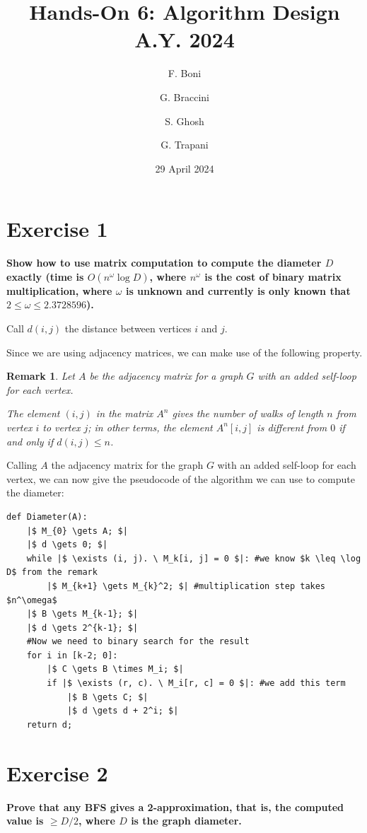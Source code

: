 \documentclass{article}
\title{Hands-On 6: Algorithm Design A.Y. 2024}
\author{F. Boni \and G. Braccini \and S. Ghosh \and G. Trapani}
\date{29 April 2024}
\newtheorem*{remark}{Remark}
\begin{document}
\maketitle

\section{Exercise 1}
\textbf{Show how to use matrix computation to compute
the diameter \(D\) exactly (time is \(O(n^\omega \log D)\), where \(n^\omega\) is the
cost of binary matrix multiplication, where \(\omega\) is unknown and currently is
only known that \(2 \leq \omega \leq 2.3728596\)).}

Call \(d(i, j)\) the distance between vertices \(i\) and \(j\).

Since we are using adjacency matrices, we can make use of the following property.
\begin{remark}
	Let \(A\) be the adjacency matrix for a graph \(G\) with an added self-loop for each vertex.

	\noindent The element \(\left(i, j\right)\) in the matrix \(A^n\) gives the number of walks of length \(n\)
	from vertex \(i\) to vertex \(j\); in other terms, the element \(A^n[i, j]\) is different from \(0\)
	if and only if \(d(i, j) \leq n\).
\end{remark}

Calling \(A\) the adjacency matrix for the graph \(G\) with an added self-loop for each vertex,
we can now give the pseudocode of the algorithm we can use to compute the diameter:
\begin{verbatim}
def Diameter(A):
	|$ M_{0} \gets A; $|
	|$ d \gets 0; $|
	while |$ \exists (i, j). \ M_k[i, j] = 0 $|: #we know $k \leq \log D$ from the remark 
		|$ M_{k+1} \gets M_{k}^2; $| #multiplication step takes $n^\omega$
	|$ B \gets M_{k-1}; $|
	|$ d \gets 2^{k-1}; $|
	#Now we need to binary search for the result
	for i in [k-2; 0]:
		|$ C \gets B \times M_i; $|
		if |$ \exists (r, c). \ M_i[r, c] = 0 $|: #we add this term
			|$ B \gets C; $|
			|$ d \gets d + 2^i; $|
	return d;
\end{verbatim}

\pagebreak
\section*{Exercise 2}
\textbf{Prove that any BFS gives a 2-approximation, that is, the computed value is
\(\geq D/2\), where \(D\) is the graph diameter.}
\end{document}
